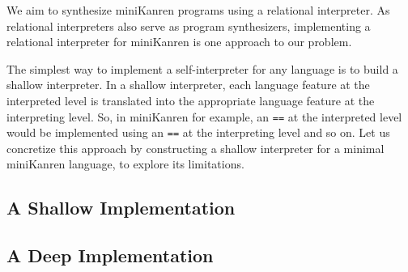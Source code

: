 We aim to synthesize miniKanren programs using a relational interpreter. As
relational interpreters also serve as program synthesizers, implementing a
relational interpreter for miniKanren is one approach to our problem.

The simplest way to implement a self-interpreter for any language is to build a
shallow interpreter. In a shallow interpreter, each language feature at the
interpreted level is translated into the appropriate language feature at the
interpreting level. So, in miniKanren for example, an \Verb|==| at the
interpreted level would be implemented using an \Verb|==| at the interpreting
level and so on. Let us concretize this approach by constructing a shallow
interpreter for a minimal miniKanren language, to explore its limitations.

\subsection{A Shallow Implementation}
\label{subsec:shallow}


\subsection{A Deep Implementation}
\label{subsec:deep}


